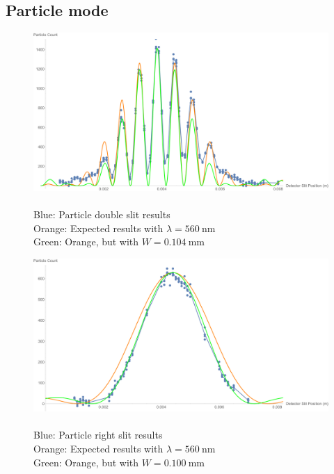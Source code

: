 \documentclass[a4paper]{scrartcl}
\begin{document}
\subsection{Particle mode}
\begin{figure}
    \centering
    \includegraphics[width = 18cm]{particle-double-slit.png}
    \caption{\\
        Blue: Particle double slit results \\
        Orange: Expected results with \(\lambda = \SI{560}{\nano\metre}\) \\
        Green: Orange, but with \(W = \SI{0.104}{\milli\metre}\)
    }
    \label{fig:particle-double-slit}
\end{figure}
\begin{figure}
    \centering
    \includegraphics[width = 18cm]{particle-single-slit.png}
    \caption{\\
        Blue: Particle right slit results \\
        Orange: Expected results with \(\lambda = \SI{560}{\nano\metre}\) \\
        Green: Orange, but with \(W = \SI{0.100}{\milli\metre}\)
    }
    \label{fig:particle-single-slit}
\end{figure}
\end{document}
